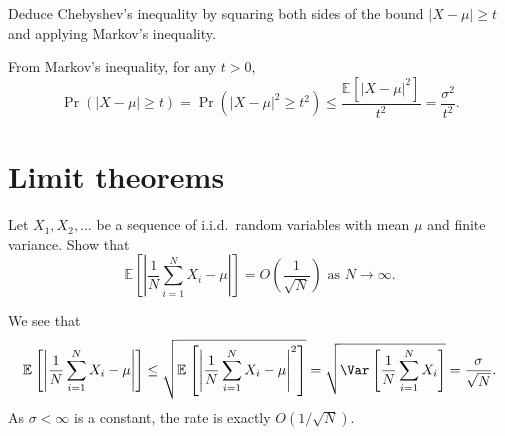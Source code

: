 
\begin{problem*}[Exercise 1.2.6]\label{ex1.2.6}
	Deduce Chebyshev's inequality by squaring both sides of the bound \(\lvert X - \mu \rvert \geq t\) and applying Markov's inequality.
\end{problem*}
\begin{answer}
	From Markov's inequality, for any \(t > 0\),
	\[
		\Pr_{}(\vert X - \mu  \vert \geq t)
		= \Pr_{}(\vert X - \mu  \vert ^2 \geq t^2)
		\leq \frac{\mathbb{E}_{}\left[\vert X - \mu \vert ^2 \right] }{t^2}
		= \frac{\sigma ^2}{t^2}.
	\]
\end{answer}

\section{Limit theorems}

\begin{problem*}[Exercise 1.3.3]\label{ex1.3.3}
	Let \(X_1, X_2, \dots \) be a sequence of i.i.d.\ random variables with mean \(\mu \) and finite variance. Show that
	\[
		\mathbb{E}_{}\left[\left\lvert \frac{1}{N} \sum_{i=1}^{N} X_i - \mu \right\rvert \right]
		= O\left( \frac{1}{\sqrt{N} } \right)
		\text{ as } N \to \infty .
	\]
\end{problem*}
\begin{answer}
	We see that
	\[
		\mathbb{E}_{}\left[\left\vert \frac{1}{N} \sum_{i=1}^{N} X_i - \mu \right\vert \right]
		\leq \sqrt{\mathbb{E}_{}\left[\left\vert \frac{1}{N} \sum_{i=1}^{N} X_i - \mu \right\vert ^2 \right] }
		= \sqrt{\Var_{}\left[\frac{1}{N} \sum_{i=1}^{N} X_i \right] }
		= \frac{\sigma}{\sqrt{N} }.
	\]
	As \(\sigma < \infty \) is a constant, the rate is exactly \(O(1 / \sqrt{N} )\).
\end{answer}